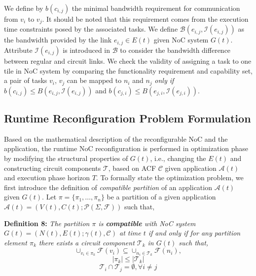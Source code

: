 {{We define by $b(c_{i,j})$ the minimal bandwidth requirement for communication from $v_{i}$ to $v_{j}$. It should be noted that this requirement comes from the execution time constraints posed by the associated tasks. We define $\mathcal B(e_{i,j}, \mathcal I(e_{i,j}))$ as the bandwidth provided by the link $e_{i,j} \in E(t)$ given NoC system $G(t)$. Attribute $\mathcal I(e_{i,j})$ is introduced in $\mathcal B$ to consider the bandwidth difference between regular and circuit links. We check the validity of assigning a task to one tile in NoC system by comparing the functionality requirement and capability set, a pair of tasks $v_i$, $v_j$ can be mapped to $n_i$ and $n_j$ \textit{only if} $b(c_{i,j}) \leq B(e_{i,j}, \mathcal I(e_{i,j}))$ and $b(c_{j,i}) \leq B(e_{j,i}, \mathcal I(e_{j,i}))$. 

\subsection{Runtime Reconfiguration Problem Formulation}

Based on the mathematical description of the reconfigurable NoC and the application, the runtime NoC reconfiguration is performed in optimization phase by modifying the structural properties of $G(t)$, i.e., changing the $E(t)$ and constructing circuit components $\mathcal T$, based on ACF $\mathcal C$ given application $\mathcal A(t)$ and execution phase horizon $T$. To formally state the optimization problem, we first introduce the definition of \textit{compatible partition} of an application $\mathcal A(t)$ given $G(t)$. Let $\pi=\{\pi_1, \ldots, \pi_n\}$ be a partition of a given application $\mathcal A(t)=(V(t),C(t);\mathcal P(\Sigma,\mathcal F))$ such that,
 
\noindent \textbf{Definition 8:} \textit{The partition $\pi$ is \textbf{compatible} with NoC system $G(t)=(N(t),E(t);\gamma(t),\mathcal C)$ at time $t$ if and only if for any partition element $\pi_{k}$ there exists a circuit component $\mathcal T_{k}$ in $G(t)$ such that,}
\begin{equation}\label{eq:compt_1}
\cup_{v_i \in \pi_{k}} \mathcal F(v_i) \subseteq \cup_{n_i\in \mathcal T_{k}} \mathcal F(n_i),
\end{equation}
\begin{equation}\label{eq:compt_2}
|\pi_k| \leq |\mathcal T_{k}|
\end{equation}
\begin{equation}\label{eq:compt_3}
\mathcal T_{i} \cap \mathcal T_{j}=\emptyset, \forall i\neq j
\end{equation}

}}
